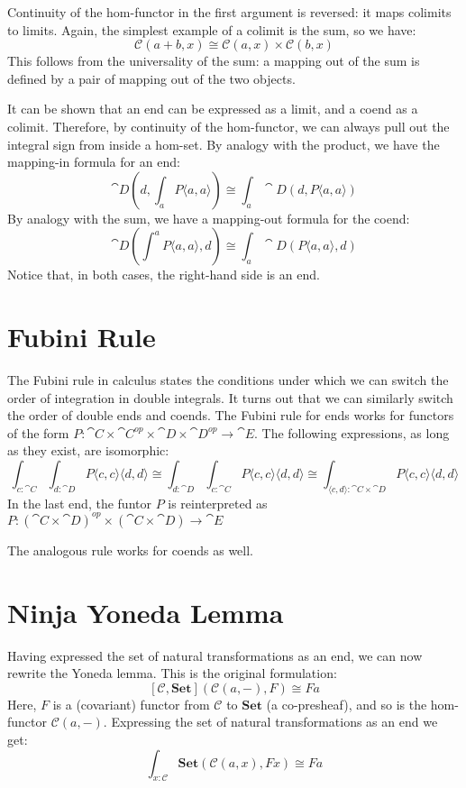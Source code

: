 \documentclass[DaoFP]{subfiles}
\begin{document}
Continuity of the hom-functor in the first argument is reversed: it maps colimits to limits. Again, the simplest example of a colimit is the sum, so we have:
\[ \mathcal{C}(a + b, x) \cong \mathcal{C}(a, x) \times \mathcal{C}(b, x) \]
This follows from the universality of the sum: a mapping out of the sum is defined by a pair of mapping out of the two objects.

It can be shown that an end can be expressed as a limit, and a coend as a colimit. Therefore, by continuity of the hom-functor, we can always pull out the integral sign from inside a hom-set. By analogy with the product, we have the mapping-in formula for an end:
\[\cat D\left(d, \int_a P\langle a, a \rangle \right) \cong \int_a \cat D(d, P\langle a, a \rangle) \]
By analogy with the sum, we have a mapping-out formula for the coend:
\[\cat D\left( \int^a P\langle a, a \rangle , d \right) \cong \int_a \cat D(P\langle a, a \rangle, d) \]
Notice that, in both cases, the right-hand side is an end.

\section{Fubini Rule}

The Fubini rule in calculus states the conditions under which we can switch the order of integration in double integrals. It turns out that we can similarly switch the order of double ends and coends. The Fubini rule for ends works for functors of the form $P \colon \cat C \times \cat C^{op} \times \cat D \times \cat D^{op} \to \cat E$. The following expressions, as long as they exist, are isomorphic:
\[ \int_{c \colon \cat C} \int_{d \colon \cat D} P\langle c, c \rangle \langle d, d \rangle \cong  \int_{d \colon \cat D} \int_{c \colon \cat C} P\langle c, c \rangle \langle d, d \rangle \cong  \int_{\langle c, d \rangle \colon \cat C \times \cat D}  P\langle c, c \rangle \langle d, d \rangle \]
In the last end, the funtor $P$ is reinterpreted as $P \colon (\cat C  \times \cat D)^{op} \times (\cat C \times \cat D)\to \cat E$

The analogous rule works for coends as well.

\section{Ninja Yoneda Lemma}

Having expressed the set of natural transformations as an end, we can now rewrite the Yoneda lemma. This is the original formulation:
\[ [\mathcal{C}, \mathbf{Set}]( \mathcal{C}(a, -), F) \cong F a \]
Here, $F$ is a (covariant) functor from $\mathcal{C}$ to $\mathbf{Set}$ (a co-presheaf), and so is the hom-functor $\mathcal{C}(a, -)$. 
Expressing the set of natural transformations as an end we get:
\[ \int_{x \colon \mathcal{C}} \mathbf{Set} (\mathcal{C}(a, x), F x) \cong F a \]
\end{document}

